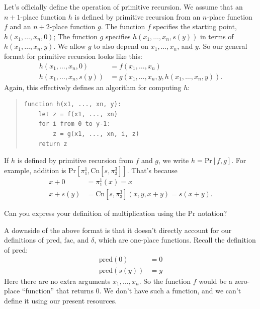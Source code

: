 Let's officially define the operation of primitive recursion.
We assume that an $n\!+\!1$-place function $h$ is defined by primitive recursion from
an $n$-place function $f$ and an $n\!+\!2$-place function $g$.
The function $f$ specifies the starting point, $h(x_1,\ldots,x_n,0)$;
The function $g$ specifies $h(x_1,\ldots,x_n,s(y))$ in terms of $h(x_1,\ldots,x_n,y)$.
We allow $g$ to also depend on $x_1, \ldots, x_n$, and $y$.
So our general format for primitive recursion looks like this:
\begin{align*}
  h(x_1,\ldots,x_n,0) &= f(x_1,\ldots,x_n)\\
  h(x_1,\ldots,x_n,s(y)) &= g(x_1,\ldots,x_n,y,h(x_1,\ldots,x_n,y)).
\end{align*}
\noindent%
Again, this effectively defines an algorithm for computing $h$:

\begin{quote}\small
\begin{verbatim}
function h(x1, ..., xn, y):
    let z = f(x1, ..., xn)
    for i from 0 to y-1:
        z = g(x1, ..., xn, i, z)
    return z
\end{verbatim}
\end{quote}

If $h$ is defined by primitive recursion from $f$ and $g$,
we write $h = \mathrm{Pr}[f,g]$.
For example, addition is $\mathrm{Pr}[\pi^1_1,\mathrm{Cn}[s,\pi^{3}_{3}]]$.
That's because
\begin{align*}
  x + 0 &= \pi^{1}_{1}(x) = x\\
  x + s(y) &= \mathrm{Cn}[s, \pi^{3}_{3}](x,y,x+y) = s(x+y).
\end{align*}

\begin{exercise}
  Can you express your definition of multiplication using the $\mathrm{Pr}$ notation?
\end{exercise}

A downside of the above format is that
it doesn't directly account for our definitions of $\mathrm{pred}$, $\mathrm{fac}$, and $\delta$,
which are one-place functions.
Recall the definition of $\mathrm{pred}$:
\begin{align*}
  \mathrm{pred}(0) &= 0\\
  \mathrm{pred}(s(y)) &= y
\end{align*}
\noindent%
Here there are no extra arguments $x_1, \ldots, x_n$.
So the function $f$ would be a zero-place ``function'' that returns 0.
We don't have such a function,
and we can't define it using our present resources.

